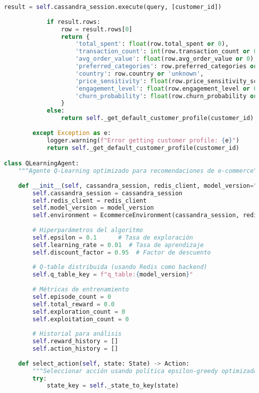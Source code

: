 \begin{lstlisting}[language=python, caption=Implementación Completa del Agente Q-Learning, label=lst:ql_implementation]
            result = self.cassandra_session.execute(query, [customer_id])
            
            if result.rows:
                row = result.rows[0]
                return {
                    'total_spent': float(row.total_spent or 0),
                    'transaction_count': int(row.transaction_count or 0),
                    'avg_order_value': float(row.avg_order_value or 0),
                    'preferred_categories': row.preferred_categories or {},
                    'country': row.country or 'unknown',
                    'price_sensitivity': float(row.price_sensitivity_score or 0.5),
                    'engagement_level': float(row.engagement_level or 0.5),
                    'churn_probability': float(row.churn_probability or 0.3)
                }
            else:
                return self._get_default_customer_profile(customer_id)
                
        except Exception as e:
            logger.warning(f"Error getting customer profile: {e}")
            return self._get_default_customer_profile(customer_id)

class QLearningAgent:
    """Agente Q-Learning optimizado para recomendaciones de e-commerce"""
    
    def __init__(self, cassandra_session, redis_client, model_version="v2.1.0"):
        self.cassandra_session = cassandra_session
        self.redis_client = redis_client
        self.model_version = model_version
        self.environment = EcommerceEnvironment(cassandra_session, redis_client)
        
        # Hiperparámetros del algoritmo
        self.epsilon = 0.1      # Tasa de exploración
        self.learning_rate = 0.01  # Tasa de aprendizaje
        self.discount_factor = 0.95  # Factor de descuento
        
        # Q-table distribuida (usando Redis como backend)
        self.q_table_key = f"q_table:{model_version}"
        
        # Métricas de entrenamiento
        self.episode_count = 0
        self.total_reward = 0.0
        self.exploration_count = 0
        self.exploitation_count = 0
        
        # Historial para análisis
        self.reward_history = []
        self.action_history = []
        
    def select_action(self, state: State) -> Action:
        """Seleccionar acción usando política epsilon-greedy optimizada"""
        try:
            state_key = self._state_to_key(state)
            

\end{lstlisting}
